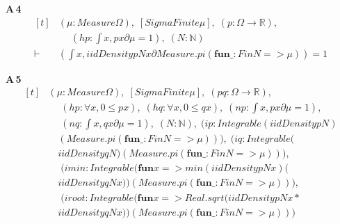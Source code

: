 \noindent\textbf{A\,4}\quad{}
{\footnotesize\[ \begin{aligned}[t]
&(\mu : \mathit{Measure} \Omega ),\; [\mathit{SigmaFinite} \mu ],\; (\mathit{p} : \Omega \to \mathbb{R} ),\\
&\quad \; (\mathit{hp} : \int \mathit{x}, \mathit{p} \mathit{x} ∂\mu = 1),\; (\mathit{N} : \mathbb{N} )\\
\vdash\;&(\int \mathit{x}, \mathit{iidDensity} \mathit{p} \mathit{N} \mathit{x} ∂\mathit{Measure}.\mathit{pi} (\mathbf{fun} \mathit{\_} : \mathit{Fin} \mathit{N} => \mu )) = 1
\end{aligned} \]}

\noindent\textbf{A\,5}\quad{}
{\footnotesize\[ \begin{aligned}[t]
&(\mu : \mathit{Measure} \Omega ),\; [\mathit{SigmaFinite} \mu ],\; (\mathit{p} \mathit{q} : \Omega \to \mathbb{R} ),\\
&\quad \; (\mathit{hp} : \forall \mathit{x}, 0 \leq \mathit{p} \mathit{x}),\; (\mathit{hq} : \forall \mathit{x}, 0 \leq \mathit{q} \mathit{x}),\; (\mathit{np} : \int \mathit{x}, \mathit{p} \mathit{x} ∂\mu = 1),\\
&\quad \; (\mathit{nq} : \int \mathit{x}, \mathit{q} \mathit{x} ∂\mu = 1),\; (\mathit{N} : \mathbb{N} ),\; (\mathit{ip} : \mathit{Integrable} (\mathit{iidDensity} \mathit{p} \mathit{N})\\
&\quad (\mathit{Measure}.\mathit{pi} (\mathbf{fun} \mathit{\_} : \mathit{Fin} \mathit{N} => \mu ))),\; (\mathit{iq} : \mathit{Integrable} (\\
&\quad \mathit{iidDensity} \mathit{q} \mathit{N}) (\mathit{Measure}.\mathit{pi} (\mathbf{fun} \mathit{\_} : \mathit{Fin} \mathit{N} => \mu ))),\\
&\quad \; (\mathit{imin} : \mathit{Integrable} (\mathbf{fun} \mathit{x} => \mathit{min} (\mathit{iidDensity} \mathit{p} \mathit{N} \mathit{x}) (\\
&\quad \mathit{iidDensity} \mathit{q} \mathit{N} \mathit{x})) (\mathit{Measure}.\mathit{pi} (\mathbf{fun} \mathit{\_} : \mathit{Fin} \mathit{N} => \mu ))),\\
&\quad \; (\mathit{iroot} : \mathit{Integrable} (\mathbf{fun} \mathit{x} => \mathit{Real}.\mathit{sqrt} (\mathit{iidDensity} \mathit{p} \mathit{N} \mathit{x}*\\
&\quad \mathit{iidDensity} \mathit{q} \mathit{N} \mathit{x})) (\mathit{Measure}.\mathit{pi} (\mathbf{fun} \mathit{\_} : \mathit{Fin} \mathit{N} => \mu )))\\

\end{aligned}\]}
